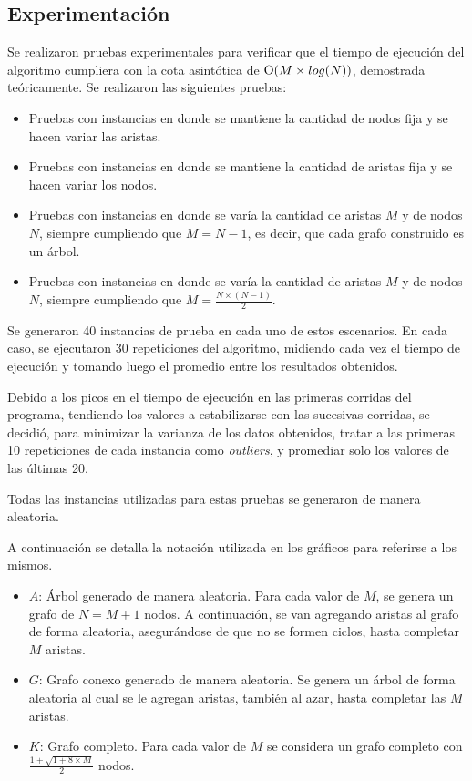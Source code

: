     \subsection{Experimentación}

    Se realizaron pruebas experimentales para verificar que el tiempo de ejecución del algoritmo cumpliera con la cota asintótica de $\operatorname{O}(M \times log(N))$, demostrada teóricamente. Se realizaron las siguientes pruebas:

    \begin{itemize}
    \item Pruebas con instancias en donde se mantiene la cantidad de nodos fija y se hacen variar las aristas.
    \item Pruebas con instancias en donde se mantiene la cantidad de aristas fija y se hacen variar los nodos.
    \item Pruebas con instancias en donde se varía la cantidad de aristas $M$ y de nodos $N$, siempre cumpliendo que $M = N  - 1$, es decir, que cada grafo construido es un árbol.
    \item Pruebas con instancias en donde se varía la cantidad de aristas $M$ y de nodos $N$, siempre cumpliendo que $M = \frac{N \times (N - 1)}{2}$.
    \end{itemize}

    Se generaron 40 instancias de prueba en cada uno de estos escenarios. En cada caso, se ejecutaron 30 repeticiones del algoritmo, midiendo cada vez el tiempo de ejecución y tomando luego el promedio entre los resultados obtenidos.

    Debido a los picos en el tiempo de ejecución en las primeras corridas del programa, tendiendo los valores a estabilizarse con las sucesivas corridas, se decidió, para minimizar la varianza de los datos obtenidos, tratar a las primeras 10 repeticiones de cada instancia como \textit{outliers}, y promediar solo los valores de las últimas 20.

    Todas las instancias utilizadas para estas pruebas se generaron de manera aleatoria.

    A continuación se detalla la notación utilizada en los gráficos para referirse a los mismos.

    \begin{itemize}
        \item $A$: Árbol generado de manera aleatoria. Para cada valor de $M$, se genera un grafo de $N = M+1$ nodos. A continuación, se van agregando aristas al grafo de forma aleatoria, asegurándose de que no se formen ciclos, hasta completar $M$ aristas.
        \item $G$: Grafo conexo generado de manera aleatoria. Se genera un árbol de forma aleatoria al cual se le agregan aristas, también al azar, hasta completar las $M$ aristas.
        \item $K$: Grafo completo. Para cada valor de $M$ se considera un grafo completo con $\frac{1 + \sqrt{1 + 8 \times M}}{2}$ nodos.
    \end{itemize}

